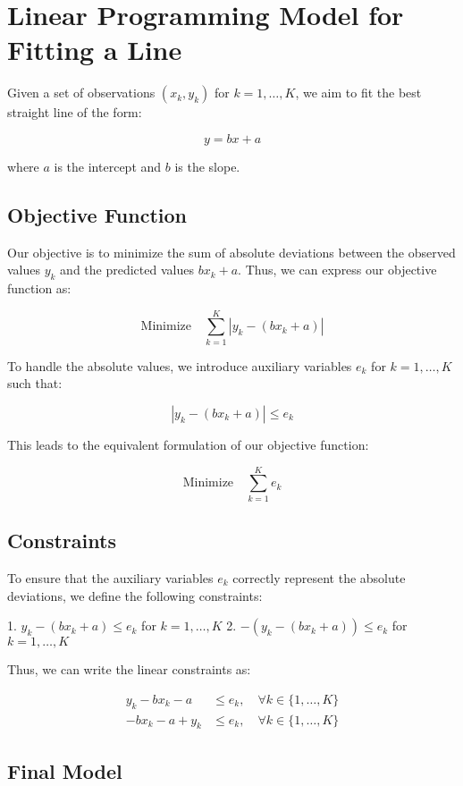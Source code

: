 \documentclass{article}
\begin{document}
\section*{Linear Programming Model for Fitting a Line}

Given a set of observations \( (x_k, y_k) \) for \( k = 1, \ldots, K \), we aim to fit the best straight line of the form:

\[
y = bx + a
\]

where \( a \) is the intercept and \( b \) is the slope.

\subsection*{Objective Function}

Our objective is to minimize the sum of absolute deviations between the observed values \( y_k \) and the predicted values \( bx_k + a \). Thus, we can express our objective function as:

\[
\text{Minimize} \quad \sum_{k=1}^{K} |y_k - (bx_k + a)|
\]

To handle the absolute values, we introduce auxiliary variables \( e_k \) for \( k = 1, \ldots, K \) such that:

\[
|y_k - (bx_k + a)| \leq e_k
\]

This leads to the equivalent formulation of our objective function:

\[
\text{Minimize} \quad \sum_{k=1}^{K} e_k
\]

\subsection*{Constraints}

To ensure that the auxiliary variables \( e_k \) correctly represent the absolute deviations, we define the following constraints:

1. \( y_k - (bx_k + a) \leq e_k \) for \( k = 1, \ldots, K \)
2. \( -(y_k - (bx_k + a)) \leq e_k \) for \( k = 1, \ldots, K \)

Thus, we can write the linear constraints as:

\[
\begin{align*}
y_k - bx_k - a & \leq e_k, \quad \forall k \in \{1, \ldots, K\} \\
-bx_k - a + y_k & \leq e_k, \quad \forall k \in \{1, \ldots, K\}
\end{align*}
\]

\subsection*{Final Model}
\end{document}
